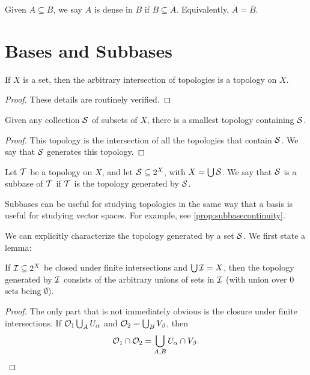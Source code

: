 \begin{definition}[Density]
    Given $A \subseteq B$, we say $A$ is dense in $B$ if $B \subseteq \overline{A}$. Equivalently, $\overline{A} = \overline{B}$.
\end{definition}

\section{Bases and Subbases}

\begin{proposition}
    If $X$ is a set, then the arbitrary intersection of topologies is a topology on $X$.
\end{proposition}

\begin{proof}
    These details are routinely verified.
\end{proof}

\begin{corollary}
    Given any collection $\mathcal S$ of subsets of $X$, there is a smallest topology containing $\mathcal S$.
\end{corollary}

\begin{proof}
    This topology is the intersection of all the topologies that contain $\mathcal S$. We say that $\mathcal S$ generates this topology.
\end{proof}

\begin{definition}[Subbase]
    Let $\mathcal T$ be a topology on $X$, and let $\mathcal S \subseteq 2^X$, with $X = \bigcup \mathcal S$. We say that $\mathcal S$ is a subbase of $\mathcal T$ if $\mathcal T$ is the topology generated by $\mathcal S$.
\end{definition}

Subbases can be useful for studying topologies in the same way that a basis is useful for studying vector spaces. For example, see \autoref{prop:subbasecontinuity}.

We can explicitly characterize the topology generated by a set $\mathcal S$. We first state a lemma:

\begin{lemma}
    If $\mathcal I \subseteq 2^X$ be closed under finite intersections and $\bigcup \mathcal I = X$, then the topology generated by $\mathcal I$ consists of the arbitrary unions of sets in $\mathcal I$ (with union over $0$ sets being $\emptyset$).
\end{lemma}

\begin{proof}
    The only part that is not immediately obvious is the closure under finite intersections. If $\mathcal O_1 \bigcup_A U_\alpha$ and $\mathcal O_2 = \bigcup_B V_\beta$, then \[ \mathcal O_1 \cap \mathcal O_2 = \bigcup_{A, B} U_\alpha \cap V_\beta.\]
\end{proof}


